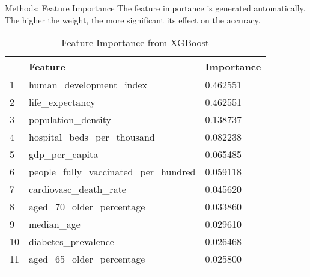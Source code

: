 \begin{frame}{Methods: Feature Importance}
The feature importance is generated automatically. The higher the weight, the more significant its effect on the accuracy.
\begin{table}
	\caption{Feature Importance from XGBoost}
	\centering
	\begin{tabular}{lll}
		\toprule
		& \textbf{Feature} & \textbf{Importance} \\
		\midrule
		1& human\_development\_index & 0.462551 \\
		2& life\_expectancy& 0.462551\\
		3& population\_density& 0.138737\\
		4& hospital\_beds\_per\_thousand& 0.082238\\
		5& gdp\_per\_capita& 0.065485\\
		6& people\_fully\_vaccinated\_per\_hundred& 0.059118\\
		7& cardiovasc\_death\_rate& 0.045620\\
		8& aged\_70\_older\_percentage& 0.033860\\
		9& median\_age& 0.029610\\
		10& diabetes\_prevalence& 0.026468\\
		11& aged\_65\_older\_percentage& 0.025800\\
		\bottomrule
	\label{tab:feature_importance}
	\end{tabular}
\end{table}
\end{frame}